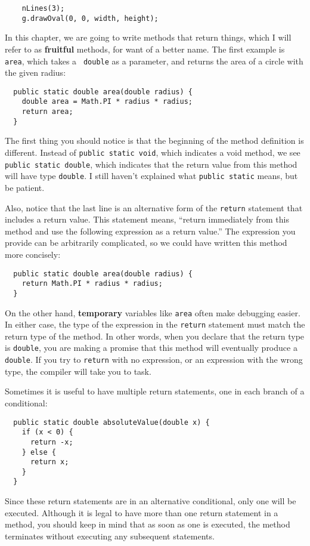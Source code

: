 \documentclass{book}
\begin{document}
\begin{verbatim}
    nLines(3);
    g.drawOval(0, 0, width, height);
\end{verbatim}
%
In this chapter, we are going to write methods that return things,
which I will refer to as {\bf fruitful} methods, for want of a better
name.  The first example is {\tt area}, which takes a {\tt
double} as a parameter, and returns the area of a circle with the
given radius:

\begin{verbatim}
  public static double area(double radius) {
    double area = Math.PI * radius * radius;
    return area;
  }
\end{verbatim}
%
The first thing you should notice is that the beginning of the
method definition is different.  Instead of {\tt public static
void}, which indicates a void method, we see {\tt public static
double}, which indicates that the return value from this method
will have type {\tt double}.  I still haven't explained what
{\tt public static} means, but be patient.


Also, notice that the last line is an alternative form of the
{\tt return} statement that includes a return value.  This
statement means, ``return immediately from this method and
use the following expression as a return value.''  The
expression you provide can be arbitrarily complicated,
so we could have written this method more concisely:

\begin{verbatim}
  public static double area(double radius) {
    return Math.PI * radius * radius;
  }
\end{verbatim}
%
On the other hand, {\bf temporary} variables like {\tt area} often
make debugging easier.  In either case, the type of the expression in
the {\tt return} statement must match the return type of the method.
In other words, when you declare that the return type is {\tt double},
you are making a promise that this method will eventually
produce a {\tt double}.  If you try to {\tt return} with no
expression, or an expression with the wrong type, the compiler will
take you to task.


Sometimes it is useful to have multiple return
statements, one in each branch of a conditional:

\begin{verbatim}
  public static double absoluteValue(double x) {
    if (x < 0) {
      return -x;
    } else {
      return x;
    }
  }
\end{verbatim}
%
Since these return statements are in an alternative conditional,
only one will be executed.  Although it is legal to have more than one
return statement in a method, you should keep in mind
that as soon as one is executed, the method
terminates without executing any subsequent statements.
\end{document}
